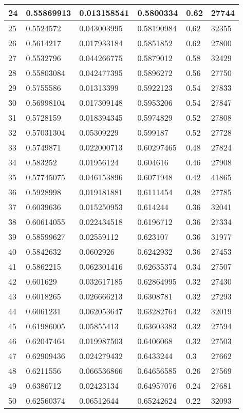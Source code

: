 \begin{longtable}{|l|l|l|l|l|l|}
24 & 0.55869913 & 0.013158541 & 0.5800334 & 0.62 & 27744 \\ \hline 
25 & 0.5524572 & 0.043003995 & 0.58190984 & 0.62 & 32355 \\ \hline 
26 & 0.5614217 & 0.017933184 & 0.5851852 & 0.62 & 27800 \\ \hline 
27 & 0.5532796 & 0.044266775 & 0.5879012 & 0.58 & 32429 \\ \hline 
28 & 0.55803084 & 0.042477395 & 0.5896272 & 0.56 & 27750 \\ \hline 
29 & 0.5755586 & 0.01313399 & 0.5922123 & 0.54 & 27833 \\ \hline 
30 & 0.56998104 & 0.017309148 & 0.5953206 & 0.54 & 27847 \\ \hline 
31 & 0.5728159 & 0.018394345 & 0.5974829 & 0.52 & 27808 \\ \hline 
32 & 0.57031304 & 0.05309229 & 0.599187 & 0.52 & 27728 \\ \hline 
33 & 0.5749871 & 0.022000713 & 0.60297465 & 0.48 & 27824 \\ \hline 
34 & 0.583252 & 0.01956124 & 0.604616 & 0.46 & 27908 \\ \hline 
35 & 0.57745075 & 0.046153896 & 0.6071948 & 0.42 & 41865 \\ \hline 
36 & 0.5928998 & 0.019181881 & 0.6111454 & 0.38 & 27785 \\ \hline 
37 & 0.6039636 & 0.015250953 & 0.614244 & 0.36 & 32041 \\ \hline 
38 & 0.60614055 & 0.022434518 & 0.6196712 & 0.36 & 27334 \\ \hline 
39 & 0.58599627 & 0.02559112 & 0.623107 & 0.36 & 31977 \\ \hline 
40 & 0.5842632 & 0.0602926 & 0.6242932 & 0.36 & 27453 \\ \hline 
41 & 0.5862215 & 0.062301416 & 0.62635374 & 0.34 & 27507 \\ \hline 
42 & 0.601629 & 0.032617185 & 0.62864995 & 0.32 & 27430 \\ \hline 
43 & 0.6018265 & 0.026666213 & 0.6308781 & 0.32 & 27293 \\ \hline 
44 & 0.6061231 & 0.062053647 & 0.63282764 & 0.32 & 32019 \\ \hline 
45 & 0.61986005 & 0.05855413 & 0.63603383 & 0.32 & 27594 \\ \hline 
46 & 0.62047464 & 0.019987503 & 0.6406068 & 0.32 & 27503 \\ \hline 
47 & 0.62909436 & 0.024279432 & 0.6433244 & 0.3 & 27662 \\ \hline 
48 & 0.6211556 & 0.066536866 & 0.64656585 & 0.26 & 27569 \\ \hline 
49 & 0.6386712 & 0.02423134 & 0.64957076 & 0.24 & 27681 \\ \hline 
50 & 0.62560374 & 0.06512644 & 0.65242624 & 0.22 & 32093 \\ \hline 
\end{longtable}